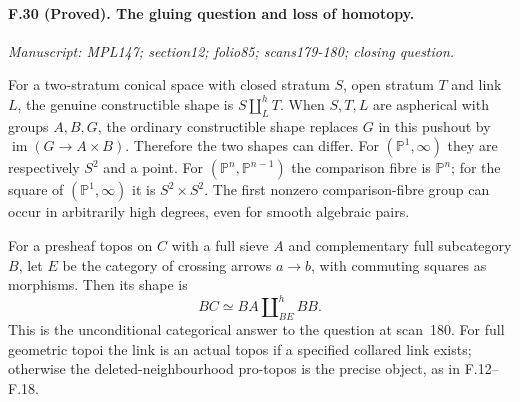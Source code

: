 \paragraph{F.30 (Proved). The gluing question
and loss of homotopy.}
\textit{Manuscript: MPL147; section12; folio85; scans179-180; closing question.}

For a two-stratum conical space with closed stratum $S$, open stratum
$T$ and link $L$, the genuine constructible shape is
$S\amalg_L^hT$. When $S,T,L$ are aspherical with groups $A,B,G$,
the ordinary constructible shape replaces $G$ in this pushout by
$\operatorname{im}(G\to A\times B)$. Therefore the two shapes can
differ. For $(\mathbb P^1,\infty)$ they are respectively $S^2$ and
a point. For $(\mathbb P^n,\mathbb P^{n-1})$ the comparison fibre
is $\mathbb P^n$; for the square of $(\mathbb P^1,\infty)$ it is
$S^2\times S^2$. The first nonzero comparison-fibre group can occur
in arbitrarily high degrees, even for smooth algebraic pairs.

For a presheaf topos on $C$ with a full sieve $A$ and complementary
full subcategory $B$, let $E$ be the category of crossing arrows
$a\to b$, with commuting squares as morphisms. Then its shape is
\[
 BC\simeq BA\amalg_{BE}^{h}BB.
\]
This is the unconditional categorical answer to the question at
scan~180. For full geometric topoi the link is an actual topos if a
specified collared link exists; otherwise the deleted-neighbourhood
pro-topos is the precise object, as in F.12--F.18.

